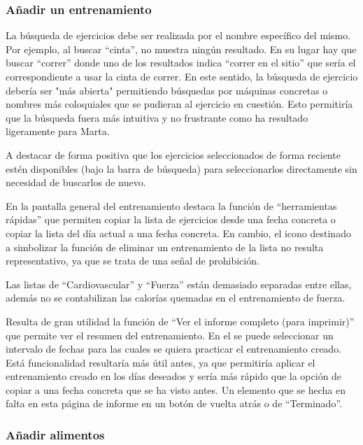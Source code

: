 \documentclass[a4paper]{article}
\begin{document}
			\subsubsection*{Añadir un entrenamiento}
			
			La búsqueda de ejercicios debe ser realizada por el nombre específico del mismo. Por ejemplo, al buscar ``cinta'', no muestra ningún resultado. En su lugar hay que buscar ``correr'' donde uno de los resultados indica ``correr en el sitio'' que sería el correspondiente a usar la cinta de correr. En este sentido, la búsqueda de ejercicio debería ser "más abierta" permitiendo búsquedas por máquinas concretas o nombres más coloquiales que se pudieran al ejercicio en cuestión. Esto permitiría que la búsqueda fuera más intuitiva y no frustrante como ha resultado ligeramente para Marta.
			
			A destacar de forma positiva que los ejercicios seleccionados de forma reciente estén disponibles (bajo la barra de búsqueda) para seleccionarlos directamente sin necesidad de buscarlos de nuevo.
			
			En la pantalla general del entrenamiento destaca la función de ``herramientas rápidas'' que permiten copiar la lista de ejercicios desde una fecha concreta o copiar la lista del día actual a una fecha concreta. En cambio, el icono destinado a simbolizar la función de eliminar un entrenamiento de la lista no resulta representativo, ya que se trata de una señal de prohibición.
			
			Las listas de ``Cardiovascular'' y ``Fuerza'' están demasiado separadas entre ellas, además no se contabilizan las calorías quemadas en el entrenamiento de fuerza.
			
			Resulta de gran utilidad la función de ``Ver el informe completo (para imprimir)'' que permite ver el resumen del entrenamiento. En el se puede seleccionar un intervalo de fechas para las cuales se quiera practicar el entrenamiento creado. Está funcionalidad resultaría más útil antes, ya que permitiría aplicar el entrenamiento creado en los días deseados y sería más rápido que la opción de copiar a una fecha concreta que se ha visto antes. Un elemento que se hecha en falta en esta página de informe en un botón de vuelta atrás o de ``Terminado''.
			
			\subsubsection*{Añadir alimentos}
			
\end{document}
